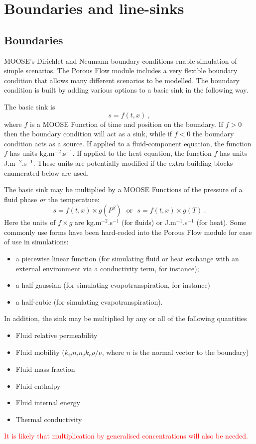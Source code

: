 \documentclass[12pt]{report}
\begin{document}
\chapter{Boundaries and line-sinks}

\section{Boundaries}

MOOSE's Dirichlet and Neumann boundary conditions enable simulation of
simple scenarios.  The Porous Flow module includes a very flexible
boundary condition that allows many different scenarios to be
modelled.  The boundary condition is built by adding various options
to a basic sink in the following way.

The basic sink is
\begin{equation}
s = f(t, x) \ ,
\end{equation}
where $f$ is a MOOSE Function of time and position on the boundary.
If $f>0$ then the boundary condition will act as a sink, while if
$f<0$ the boundary condition acts as a source.  If applied to a
fluid-component equation, the function $f$ has units
kg.m$^{-2}$.s$^{-1}$.  If applied to the heat equation, the function
$f$ has units J.m$^{-2}$.s$^{-1}$.  These units are potentially
modified if the extra building blocks enumerated below are used.

The basic sink may be multiplied by a MOOSE Functions of the pressure
of a fluid phase {\em or} the temperature:
\begin{equation}
s = f(t, x) \times g(P^{\beta}) \ \ \ \mbox{or}\ \ \ s = f(t, x)
\times g(T) \ .
\end{equation}
Here the units of $f\times g$ are kg.m$^{-2}$.s$^{-1}$ (for fluids) or
J.m$^{-1}$.s$^{-1}$ (for heat).  Some commonly use forms have been
hard-coded into the Porous Flow module for ease of use in simulations:
\begin{itemize}
\item a piecewise linear function (for simulating fluid or heat
  exchange with an external environment via a conductivity term, for instance);
\item a half-gaussian (for simulating evapotranspiration, for
  instance)
\item a half-cubic (for simulating evapotranspiration).
\end{itemize}

In addition, the sink may be multiplied by any or all of the following
quantities
\begin{itemize}
\item Fluid relative permeability
\item Fluid mobility ($k_{ij}n_{i}n_{j}k_{r} \rho / \nu$, where $n$ is the
  normal vector to the boundary)
\item Fluid mass fraction
\item Fluid enthalpy
\item Fluid internal energy
\item Thermal conductivity
\end{itemize}
\textcolor{red}{It is likely that multiplication by generalised
  concentrations will also be needed.}
\end{document}
